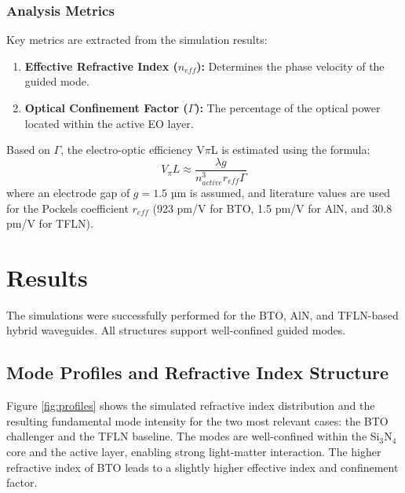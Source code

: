 \documentclass[12pt, a4paper, numbers]{report}
\begin{document}
\subsection{Analysis Metrics}
Key metrics are extracted from the simulation results:
\begin{enumerate}
    \item \textbf{Effective Refractive Index ($n_{eff}$):} Determines the phase velocity of the guided mode.
    \item \textbf{Optical Confinement Factor ($\Gamma$):} The percentage of the optical power located within the active EO layer.
\end{enumerate}
Based on $\Gamma$, the electro-optic efficiency V$\pi$L is estimated using the formula:
\begin{equation}
    V_{\pi}L \approx \frac{\lambda g}{n_{active}^3 r_{eff} \Gamma}
\end{equation}
where an electrode gap of $g=1.5$ µm is assumed, and literature values are used for the Pockels coefficient $r_{eff}$ (923 pm/V for BTO, 1.5 pm/V for AlN, and 30.8 pm/V for TFLN).

\chapter{Results}
The simulations were successfully performed for the BTO, AlN, and TFLN-based hybrid waveguides. All structures support well-confined guided modes.

\section{Mode Profiles and Refractive Index Structure}
Figure \ref{fig:profiles} shows the simulated refractive index distribution and the resulting fundamental mode intensity for the two most relevant cases: the BTO challenger and the TFLN baseline. The modes are well-confined within the Si$_3$N$_4$ core and the active layer, enabling strong light-matter interaction. The higher refractive index of BTO leads to a slightly higher effective index and confinement factor.
\end{document}
